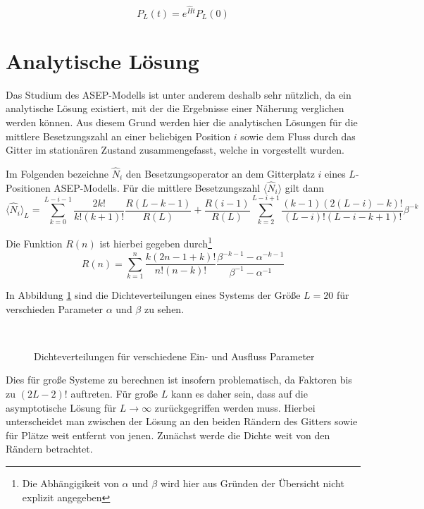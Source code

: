 \documentclass[10pt,a4paper]{report}
\begin{document}
\begin{equation}\label{ASEP_solution_equ}
P_L(t)=e^{\hat{H}t}P_L(0)
\end{equation}

\section{Analytische Lösung}

Das Studium des ASEP-Modells ist unter anderem deshalb sehr nützlich, da ein analytische Lösung existiert, mit der die Ergebnisse einer Näherung verglichen werden können. Aus diesem Grund werden hier die analytischen Lösungen für die mittlere Besetzungszahl an einer beliebigen Position $i$ sowie dem Fluss durch das Gitter im stationären Zustand zusammengefasst, welche in \cite{ASEP} vorgestellt wurden.

Im Folgenden bezeichne $\hat{N}_i$ den Besetzungsoperator an dem Gitterplatz $i$ eines $L$-Positionen ASEP-Modells. Für die mittlere Besetzungszahl $\langle\hat{N}_i\rangle$ gilt dann
\begin{equation}
\langle\hat{N}_i\rangle_L=\sum_{k=0}^{L-i-1}\frac{2k!}{k!(k+1)!}\frac{R(L-k-1)}{R(L)}+\frac{R(i-1)}{R(L)}\sum_{k=2}^{L-i+1}\frac{(k-1)(2(L-i)-k)!}{(L-i)!(L-i-k+1)!}\beta^{-k}
\end{equation}

Die Funktion $R(n)$ ist hierbei gegeben durch\footnote{Die Abhängigikeit von $\alpha$ und $\beta$ wird hier aus Gründen der Übersicht nicht explizit angegeben}
\begin{equation}
R(n)=\sum_{k=1}^{n}\frac{k(2n-1+k)!}{n!(n-k)!}\frac{\beta^{-k-1}-\alpha^{-k-1}}{\beta^{-1}-\alpha^{-1}}
\end{equation}

In Abbildung \ref{ASEP_density_img} sind die Dichteverteilungen eines Systems der Größe $L=20$ für verschieden Parameter $\alpha$ und $\beta$ zu sehen.

\begin{figure}
\centering
{}
\\
\caption{Dichteverteilungen für verschiedene Ein- und Ausfluss Parameter}
\label{ASEP_density_img}
\end{figure}

Dies für große Systeme zu berechnen ist insofern problematisch, da Faktoren bis zu $(2L-2)!$ auftreten. Für große $L$ kann es daher sein, dass auf die asymptotische Lösung für $L\rightarrow\infty$ zurückgegriffen werden muss. Hierbei unterscheidet man zwischen der Lösung an den beiden Rändern des Gitters sowie für Plätze weit entfernt von jenen. Zunächst werde die Dichte weit von den Rändern betrachtet.
\end{document}
